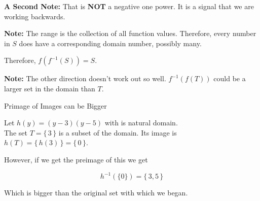 \documentclass{ximera}
\begin{document}
\textbf{A Second Note:} That is \textbf{NOT} a negative one power.  It is a signal that we are working backwards.

\textbf{Note:}  The range is the collection of all function values. Therefore, every number in $S$ does have a corresponding domain number, possibly many.

Therefore, $f(f^{-1}(S)) = S$.


\textbf{Note:}  The other direction doesn't work out so well. $f^{-1}(f(T))$ could be a larger set in the domain than $T$.



\begin{example} Primage of Images can be Bigger


Let $h(y) = (y-3)(y-5)$ with is natural domain. \\

The set $T = \{ \, 3 \, \}$ is a subset of the domain.  Its image is $h(T) = \{ \, h(3) \, \} = \{ \, 0 \, \}$.

However, if we get the preimage of this we get


\[
h^{-1}(\{ 0 \}) = \{ \,  3, 5 \,\}
\]

Which is bigger than the original set with which we began.

\end{example}
\end{document}
